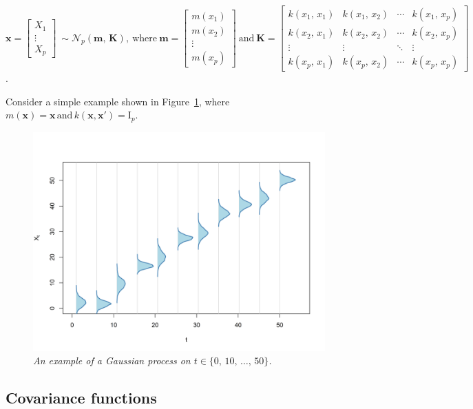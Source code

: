 \documentclass[a4paper, 10pt, fleqn]{article}
\begin{document}
\begin{flushleft}
   $\mathbf{x} =
   \begin{bmatrix}
      X_{1} \\
      \vdots \\
      X_{p}
   \end{bmatrix}
   \:
   \sim \mathcal{N}_{p}(\mathbf{m}, \, \mathbf{K}),
   \:
   \text{where}
   \:
   \mathbf{m} = 
   \begin{bmatrix}
      m(x_{1}) \\
      m(x_{2}) \\
      \vdots \\
      m(x_{p})
   \end{bmatrix}  
   \: 
   \text{and}
   \:
   \mathbf{K} = 
   \begin{bmatrix}
      k(x_{1}, \, x_{1}) & k(x_{1}, \, x_{2}) & \cdots & k(x_{1}, \, x_{p}) \\
      k(x_{2}, \, x_{1}) & k(x_{2}, \, x_{2}) & \cdots & k(x_{2}, \, x_{p}) \\
      \vdots & \vdots & \ddots & \vdots \\
      k(x_{p}, \, x_{1}) & k(x_{p}, \, x_{2}) & \cdots & k(x_{p}, \, x_{p})
   \end{bmatrix}$.
   
   \vspace{1em}

   Consider a simple example shown in Figure~\ref{figure_1}, where $m(\mathbf{x}) = \mathbf{x} \, \text{and} \, k(\mathbf{x}, \mathbf{x}') = \text{I}_{p}$. 

   \begin{figure}[H]
      \centering
      \includegraphics[width=0.48\linewidth]{../img/gp.png}
      \caption{\textit{An example of a Gaussian process on $t \in \{0, \, 10, \, \ldots, \, 50\}$.}}
      \label{figure_1}
   \end{figure}

   \subsection*{Covariance functions}


\end{flushleft}
\end{document}
